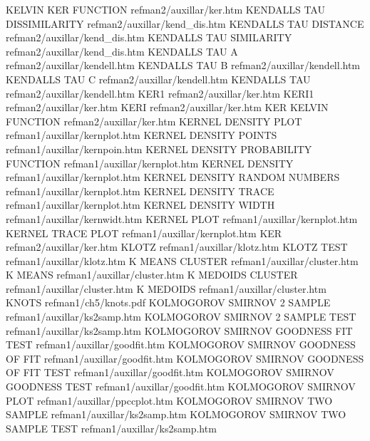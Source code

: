 KELVIN KER FUNCTION                     refman2/auxillar/ker.htm
KENDALLS TAU DISSIMILARITY              refman2/auxillar/kend_dis.htm
KENDALLS TAU DISTANCE                   refman2/auxillar/kend_dis.htm
KENDALLS TAU SIMILARITY                 refman2/auxillar/kend_dis.htm
KENDALLS TAU A                          refman2/auxillar/kendell.htm
KENDALLS TAU B                          refman2/auxillar/kendell.htm
KENDALLS TAU C                          refman2/auxillar/kendell.htm
KENDALLS TAU                            refman2/auxillar/kendell.htm
KER1                                    refman2/auxillar/ker.htm
KERI1                                   refman2/auxillar/ker.htm
KERI                                    refman2/auxillar/ker.htm
KER KELVIN FUNCTION                     refman2/auxillar/ker.htm
KERNEL DENSITY PLOT                     refman1/auxillar/kernplot.htm
KERNEL DENSITY POINTS                   refman1/auxillar/kernpoin.htm
KERNEL DENSITY PROBABILITY FUNCTION     refman1/auxillar/kernplot.htm
KERNEL DENSITY                          refman1/auxillar/kernplot.htm
KERNEL DENSITY RANDOM NUMBERS           refman1/auxillar/kernplot.htm
KERNEL DENSITY TRACE                    refman1/auxillar/kernplot.htm
KERNEL DENSITY WIDTH                    refman1/auxillar/kernwidt.htm
KERNEL PLOT                             refman1/auxillar/kernplot.htm
KERNEL TRACE PLOT                       refman1/auxillar/kernplot.htm
KER                                     refman2/auxillar/ker.htm
KLOTZ                                   refman1/auxillar/klotz.htm
KLOTZ TEST                              refman1/auxillar/klotz.htm
K MEANS CLUSTER                         refman1/auxillar/cluster.htm
K MEANS                                 refman1/auxillar/cluster.htm
K MEDOIDS CLUSTER                       refman1/auxillar/cluster.htm
K MEDOIDS                               refman1/auxillar/cluster.htm
KNOTS                                   refman1/ch5/knots.pdf
KOLMOGOROV SMIRNOV 2 SAMPLE             refman1/auxillar/ks2samp.htm
KOLMOGOROV SMIRNOV 2 SAMPLE TEST        refman1/auxillar/ks2samp.htm
KOLMOGOROV SMIRNOV GOODNESS FIT TEST    refman1/auxillar/goodfit.htm
KOLMOGOROV SMIRNOV GOODNESS OF FIT      refman1/auxillar/goodfit.htm
KOLMOGOROV SMIRNOV GOODNESS OF FIT TEST refman1/auxillar/goodfit.htm
KOLMOGOROV SMIRNOV GOODNESS TEST        refman1/auxillar/goodfit.htm
KOLMOGOROV SMIRNOV PLOT                 refman1/auxillar/ppccplot.htm
KOLMOGOROV SMIRNOV TWO SAMPLE           refman1/auxillar/ks2samp.htm
KOLMOGOROV SMIRNOV TWO SAMPLE TEST      refman1/auxillar/ks2samp.htm
